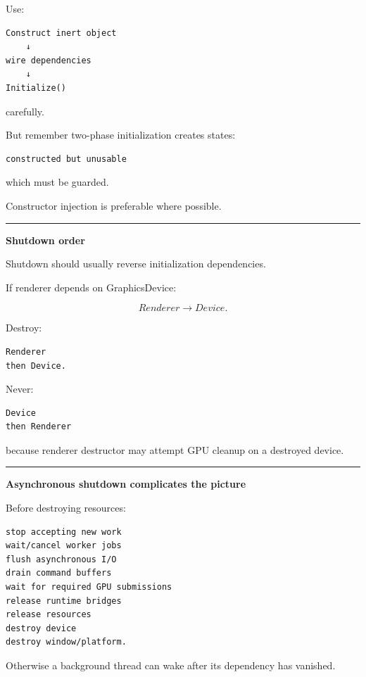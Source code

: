 Use:

\begin{verbatim}
Construct inert object
    ↓
wire dependencies
    ↓
Initialize()
\end{verbatim}

carefully.

But remember two-phase initialization creates states:

\begin{verbatim}
constructed but unusable
\end{verbatim}

which must be guarded.

Constructor injection is preferable where possible.

\begin{center}\rule{0.5\linewidth}{0.5pt}\end{center}

\textbf{Shutdown order}

Shutdown should usually reverse initialization dependencies.

If renderer depends on GraphicsDevice:

\[
Renderer\rightarrow Device.
\]

Destroy:

\begin{verbatim}
Renderer
then Device.
\end{verbatim}

Never:

\begin{verbatim}
Device
then Renderer
\end{verbatim}

because renderer destructor may attempt GPU cleanup on a destroyed device.

\begin{center}\rule{0.5\linewidth}{0.5pt}\end{center}

\textbf{Asynchronous shutdown complicates the picture}

Before destroying resources:

\begin{verbatim}
stop accepting new work
wait/cancel worker jobs
flush asynchronous I/O
drain command buffers
wait for required GPU submissions
release runtime bridges
release resources
destroy device
destroy window/platform.
\end{verbatim}

Otherwise a background thread can wake after its dependency has vanished.

